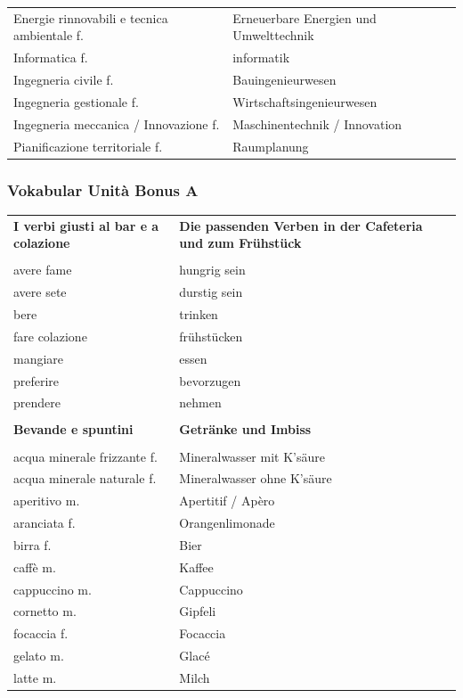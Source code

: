 \documentclass[10pt]{scrartcl}
\begin{document}
\begin{multicols*}{2}
\begin{supertabular}{p{4cm}p{4cm}}
Energie rinnovabili e tecnica ambientale \hfill f. & Erneuerbare Energien und Umwelttechnik\\
Informatica \hfill f. & informatik\\
Ingegneria civile \hfill f. & Bauingenieurwesen\\
Ingegneria gestionale \hfill f. & Wirtschaftsingenieurwesen\\
Ingegneria meccanica / Innovazione \hfill f. & Maschinentechnik / Innovation\\
Pianificazione territoriale \hfill f. & Raumplanung\\
\end{supertabular}
\subsubsection*{Vokabular Unità Bonus A}
\begin{supertabular}{p{4cm}p{4cm}}
\textbf{I verbi giusti al bar e a colazione} & \textbf{Die passenden Verben in der Cafeteria und zum Frühstück} \\
\\
avere fame & hungrig sein\\
avere sete & durstig sein\\
bere & trinken\\
fare colazione & frühstücken\\
mangiare & essen\\
preferire & bevorzugen\\
prendere & nehmen\\
\\
\textbf{Bevande e spuntini} & \textbf{Getränke und Imbiss} \\
\\
acqua minerale frizzante \hfill f. & Mineralwasser mit K'säure\\
acqua minerale naturale \hfill f. & Mineralwasser ohne K'säure\\
aperitivo \hfill m. & Apertitif / Apèro\\
aranciata \hfill f. & Orangenlimonade\\
birra \hfill f. & Bier\\
caffè \hfill m. & Kaffee\\
cappuccino \hfill m. & Cappuccino\\
cornetto \hfill m. & Gipfeli\\
focaccia \hfill f. & Focaccia\\
gelato \hfill m. & Glacé\\
latte \hfill m. & Milch\\

\end{supertabular}
\end{multicols*}
\end{document}
